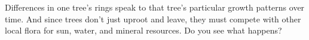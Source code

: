 Differences in one tree's rings speak to that tree's particular growth patterns over time. And since trees don't just uproot and leave, they must compete with other local flora for sun, water, and mineral resources. Do you see what happens?